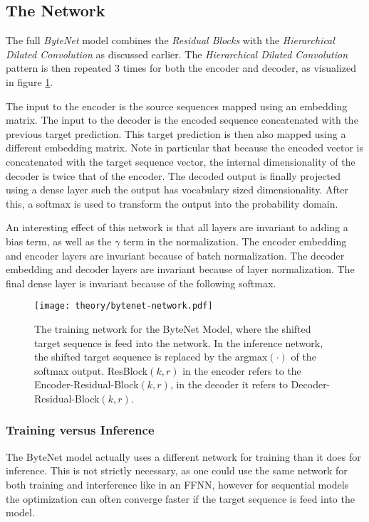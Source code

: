 \subsection{The Network}

The full \textit{ByteNet} model combines the \textit{Residual Blocks} with the \textit{Hierarchical Dilated Convolution} as discussed earlier. The \textit{Hierarchical Dilated Convolution} pattern is then repeated 3 times for both the encoder and decoder, as visualized in figure \ref{fig:bytenet:network}.

The input to the encoder is the source sequences mapped using an embedding matrix. The input to the decoder is the encoded sequence concatenated with the previous target prediction. This target prediction is then also mapped using a different embedding matrix. Note in particular that because the encoded vector is concatenated with the target sequence vector, the internal dimensionality of the decoder is twice that of the encoder. The decoded output is finally projected using a dense layer such the output has vocabulary sized dimensionality. After this, a softmax is used to transform the output into the probability domain.

An interesting effect of this network is that all layers are invariant to adding a bias term, as well as the $\gamma$ term in the normalization. The encoder embedding and encoder layers are invariant because of batch normalization. The decoder embedding and decoder layers are invariant because of layer normalization. The final dense layer is invariant because of the following softmax.

\begin{figure}[h]
    \centering
    \texttt{[image: theory/bytenet-network.pdf]}
    \caption{The training network for the ByteNet Model, where the shifted target sequence is feed into the network. In the inference network, the shifted target sequence is replaced by the $\mathrm{argmax}(\cdot)$ of the softmax output. ResBlock$(k, r)$ in the encoder refers to the Encoder-Residual-Block$(k, r)$, in the decoder it refers to Decoder-Residual-Block$(k, r)$.}
    \label{fig:bytenet:network}
\end{figure}

\subsubsection{Training versus Inference}
The ByteNet model actually uses a different network for training than it does for inference. This is not strictly necessary, as one could use the same network for both training and interference like in an FFNN, however for sequential models the optimization can often converge faster if the target sequence is feed into the model.

